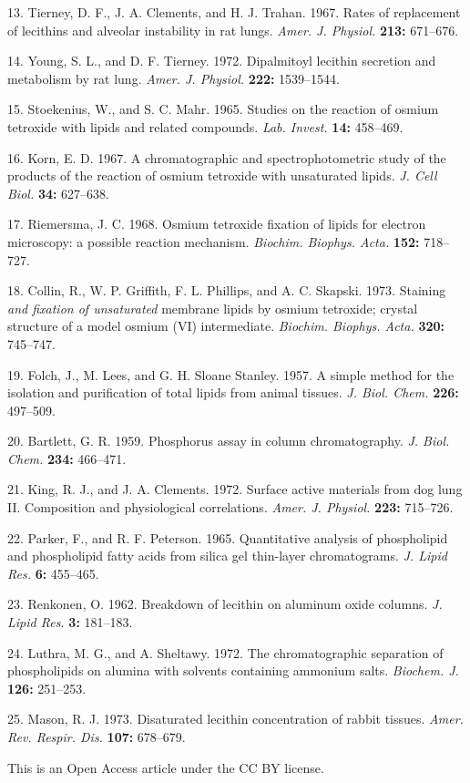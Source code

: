 \documentclass{article}
\begin{document}
\begin{hangpars}
13. Tierney, D. F., J. A. Clements, and H. J. Trahan. 1967. Rates of replacement of lecithins and alveolar instability in rat lungs. \emph{Amer. J. Physiol.} \textbf{213:} 671–676.

14. Young, S. L., and D. F. Tierney. 1972. Dipalmitoyl lecithin secretion and metabolism by rat lung. \emph{Amer. J. Physiol.} \textbf{222:} 1539–1544.

15. Stoekenius, W., and S. C. Mahr. 1965. Studies on the reaction of osmium tetroxide with lipids and related compounds. \emph{Lab. Invest.} \textbf{14:} 458–469.

16. Korn, E. D. 1967. A chromatographic and spectrophotometric study of the products of the reaction of osmium tetroxide with unsaturated lipids. \emph{J. Cell Biol.} \textbf{34:} 627–638.

17. Riemersma, J. C. 1968. Osmium tetroxide fixation of lipids for electron microscopy: a possible reaction mechanism. \emph{Biochim. Biophys. Acta.} \textbf{152:} 718–727.

18. Collin, R., W. P. Griffith, F. L. Phillips, and A. C. Skapski. 1973. Staining \emph{and fixation of unsaturated} membrane lipids by osmium tetroxide; crystal structure of a model osmium (VI) intermediate. \emph{Biochim. Biophys. Acta.} \textbf{320:} 745–747.

19. Folch, J., M. Lees, and G. H. Sloane Stanley. 1957. A simple method for the isolation and purification of total lipids from animal tissues. \emph{J. Biol. Chem.} \textbf{226:} 497–509.

20. Bartlett, G. R. 1959. Phosphorus assay in column chromatography. \emph{J. Biol. Chem.} \textbf{234:} 466–471.

21. King, R. J., and J. A. Clements. 1972. Surface active materials from dog lung II. Composition and physiological correlations. \emph{Amer. J. Physiol.} \textbf{223:} 715–726.

22. Parker, F., and R. F. Peterson. 1965. Quantitative analysis of phospholipid and phospholipid fatty acids from silica gel thin-layer chromatograms. \emph{J. Lipid Res.} \textbf{6:} 455–465.

23. Renkonen, O. 1962. Breakdown of lecithin on aluminum oxide columns. \emph{J. Lipid Res.} \textbf{3:} 181–183.

24. Luthra, M. G., and A. Sheltawy. 1972. The chromatographic separation of phospholipids on alumina with solvents containing ammonium salts. \emph{Biochem. J.} \textbf{126:} 251–253.

25. Mason, R. J. 1973. Disaturated lecithin concentration of rabbit tissues. \emph{Amer. Rev. Respir. Dis.} \textbf{107:} 678–679.
\end{hangpars}

\bigskip
\noindent This is an Open Access article under the CC BY license.
\end{document}
